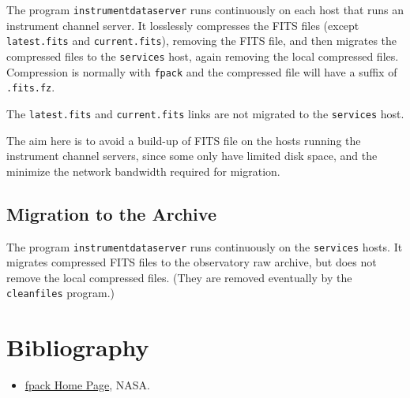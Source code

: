 The program \verb|instrumentdataserver| runs continuously on each host that runs an instrument channel server. It losslessly compresses the FITS files (except \verb|latest.fits| and \verb|current.fits|), removing the FITS file, and then migrates the compressed files to the \verb|services| host, again removing the local compressed files. Compression is normally with \verb|fpack| and the compressed file will have a suffix of \verb|.fits.fz|.

The \verb|latest.fits| and \verb|current.fits| links are not migrated to the \verb|services| host.

The aim here is to avoid a build-up of FITS file on the hosts running the instrument channel servers, since some only have limited disk space, and the minimize the network bandwidth required for migration.

\subsection{Migration to the Archive}

The program \verb|instrumentdataserver| runs continuously on the \verb|services| hosts. It migrates compressed FITS files to the observatory raw archive, but does not remove the local compressed files. (They are removed eventually by the \verb|cleanfiles| program.)

\section{Bibliography}

\begin{flushleft}
\begin{itemize}
\item \href{https://heasarc.gsfc.nasa.gov/fitsio/fpack/}{fpack Home Page}, NASA.
\end{itemize}
\end{flushleft}


